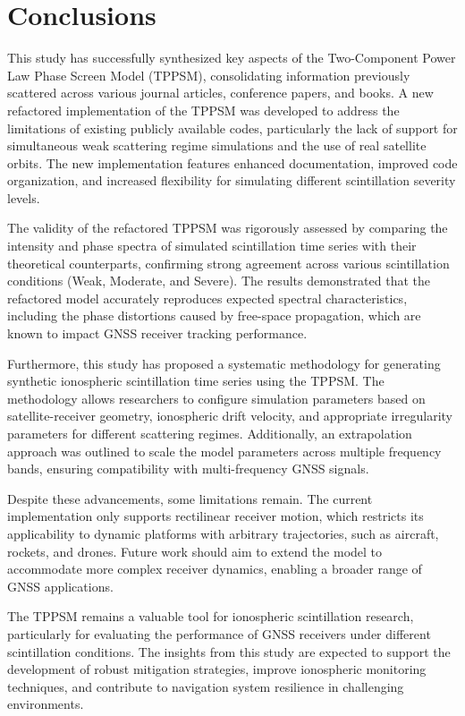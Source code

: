 \section{Conclusions}
\label{sec:conclusions}

This study has successfully synthesized key aspects of the Two-Component Power Law Phase Screen Model (TPPSM), consolidating information previously scattered across various journal articles, conference papers, and books. A new refactored implementation of the TPPSM was developed to address the limitations of existing publicly available codes, particularly the lack of support for simultaneous weak scattering regime simulations and the use of real satellite orbits. The new implementation features enhanced documentation, improved code organization, and increased flexibility for simulating different scintillation severity levels.

The validity of the refactored TPPSM was rigorously assessed by comparing the intensity and phase spectra of simulated scintillation time series with their theoretical counterparts, confirming strong agreement across various scintillation conditions (Weak, Moderate, and Severe). The results demonstrated that the refactored model accurately reproduces expected spectral characteristics, including the phase distortions caused by free-space propagation, which are known to impact GNSS receiver tracking performance.

Furthermore, this study has proposed a systematic methodology for generating synthetic ionospheric scintillation time series using the TPPSM. The methodology allows researchers to configure simulation parameters based on satellite-receiver geometry, ionospheric drift velocity, and appropriate irregularity parameters for different scattering regimes. Additionally, an extrapolation approach was outlined to scale the model parameters across multiple frequency bands, ensuring compatibility with multi-frequency GNSS signals.

Despite these advancements, some limitations remain. The current implementation only supports rectilinear receiver motion, which restricts its applicability to dynamic platforms with arbitrary trajectories, such as aircraft, rockets, and drones. Future work should aim to extend the model to accommodate more complex receiver dynamics, enabling a broader range of GNSS applications.

The TPPSM remains a valuable tool for ionospheric scintillation research, particularly for evaluating the performance of GNSS receivers under different scintillation conditions. The insights from this study are expected to support the development of robust mitigation strategies, improve ionospheric monitoring techniques, and contribute to navigation system resilience in challenging environments.

